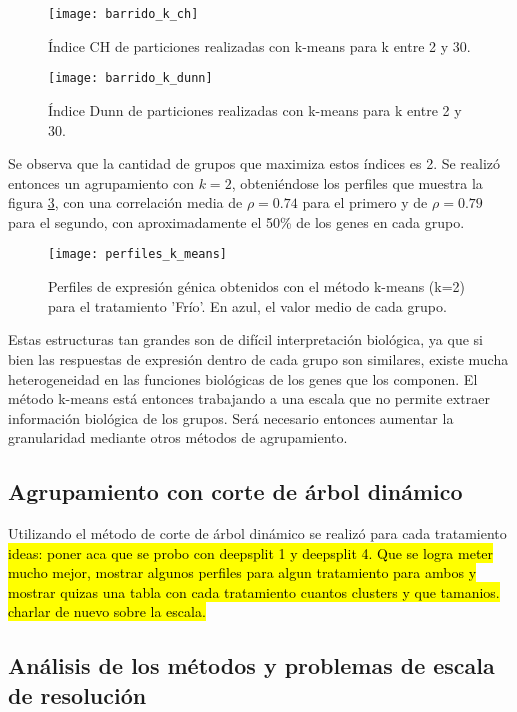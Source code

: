 \begin{figure*}[t!]
    \centering
    \begin{subfigure}[t]{0.45\textwidth}
    \centering
    \texttt{[image: barrido\_k\_ch]}
    \caption{Índice CH de particiones realizadas con k-means para k entre 2 y 30.}
    \label{fig:barrido_k_ch}
    \end{subfigure}
    \begin{subfigure}[t]{0.45\textwidth}
    \centering
    \texttt{[image: barrido\_k\_dunn]}
    \caption{Índice Dunn de particiones realizadas con k-means para k entre 2 y 30.}
    \label{fig:barrido_k_dunn}
    \end{subfigure}
    \caption{Índices de validación interna para particiones realizadas con k-means}
\end{figure*}
Se observa que la cantidad de grupos que maximiza estos índices es 2. Se realizó entonces un agrupamiento con $k=2$, obteniéndose los perfiles que muestra la figura \ref{fig:perfiles_k_means}, con una correlación media de $\rho=0.74$ para el primero y de  $\rho=0.79$ para el segundo, con aproximadamente el 50\% de los genes en cada grupo.
\begin{figure}[h]
    \centering
    \texttt{[image: perfiles\_k\_means]}
    \caption{Perfiles de expresión génica obtenidos con el método k-means (k=2) para el tratamiento 'Frío'. En azul, el valor medio de cada grupo.}
    \label{fig:perfiles_k_means}
\end{figure}
Estas estructuras tan grandes son de difícil interpretación biológica, ya que si bien las respuestas de expresión dentro de cada grupo son similares, existe mucha heterogeneidad en las funciones biológicas de los genes que los componen. El método k-means está entonces trabajando a una escala que no permite extraer información biológica de los grupos. Será necesario entonces aumentar la granularidad mediante otros métodos de agrupamiento.
\subsection{Agrupamiento con corte de árbol dinámico}
Utilizando el método de corte de árbol dinámico se realizó para cada tratamiento 
\hl{ideas: poner aca que se probo con deepsplit 1 y deepsplit 4. Que se logra meter mucho mejor, mostrar algunos perfiles para algun tratamiento para ambos y mostrar quizas una tabla con cada tratamiento cuantos clusters y que tamanios. charlar de nuevo sobre la escala.}
\subsection{Análisis de los métodos y problemas de escala de resolución}


